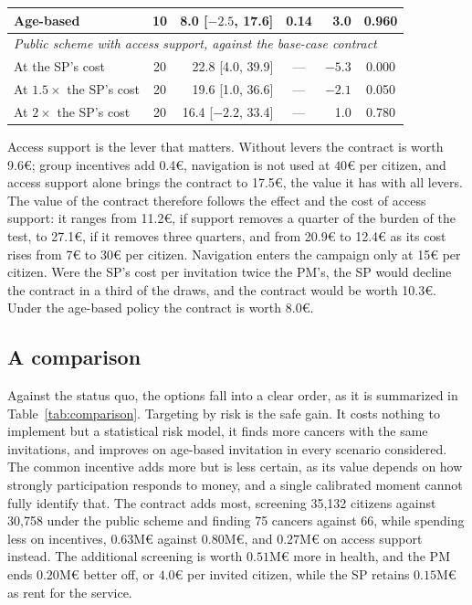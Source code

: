 \documentclass[12pt]{article}
\begin{document}
\begin{table}[h!]
\begin{tabular}{l c r c r c}
Age-based                              & 10 &  8.0 [$-2.5$, 17.6] & 0.14 & 3.0    & 0.960 \\
\midrule
\multicolumn{6}{l}{\emph{Public scheme with access support, against the base-case contract}} \\
At the SP's cost                       & 20 & 22.8 [4.0, 39.9]    & ---  & $-5.3$ & 0.000 \\
At $1.5\times$ the SP's cost           & 20 & 19.6 [1.0, 36.6]    & ---  & $-2.1$ & 0.050 \\
At $2\times$ the SP's cost             & 20 & 16.4 [$-2.2$, 33.4] & ---  & 1.0    & 0.780 \\
\bottomrule
\end{tabular}
\end{table}

Access support is the lever that matters. Without levers the contract is worth 9.6€; group incentives add 0.4€, navigation is not used at $40$€ per citizen, and access support alone brings the contract to 17.5€, the value it has with all levers. The value of the contract therefore follows the effect and the cost of access support: it ranges from 11.2€, if support removes a quarter of the burden of the test, to 27.1€, if it removes three quarters, and from 20.9€ to 12.4€ as its cost rises from 7€ to 30€ per citizen. Navigation enters the campaign only at 15€ per citizen. Were the SP's cost per invitation twice the PM's, the SP would decline the contract in a third of the draws, and the contract would be worth 10.3€. Under the age-based policy the contract is worth 8.0€.



\subsection{A comparison} \label{sec:comparison}

Against the status quo, the options fall into a clear order, as it is summarized in Table~\ref{tab:comparison}. Targeting by risk is the safe gain. It costs nothing to implement but a statistical risk model, it finds more cancers with the same invitations, and improves on age-based invitation in every scenario considered. The common incentive adds more but is less certain, as its value depends on how strongly participation responds to money, and a single calibrated moment cannot fully identify that. The contract adds most, screening 35{,}132 citizens against 30{,}758 under the public scheme and finding 75 cancers against 66, while spending less on incentives, $0.63$M€ against $0.80$M€, and $0.27$M€ on access support instead. The additional screening is worth $0.51$M€ more in health, and the PM ends $0.20$M€ better off, or $4.0$€ per invited citizen, while the SP retains $0.15$M€ as rent for the service.
\end{document}
